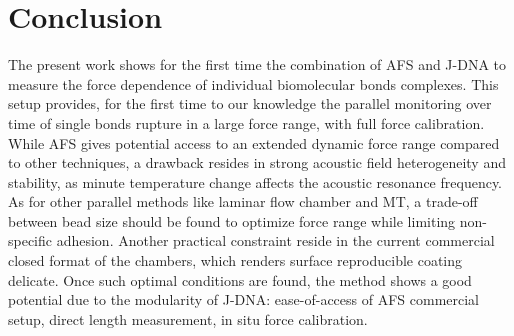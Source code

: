 \documentclass{biophys-new}
\begin{document}
%
%
%

\section*{Conclusion}

The present work shows for the first time the combination of AFS and J-DNA to measure the force dependence of individual biomolecular bonds complexes. This setup provides, for the first time to our knowledge the parallel monitoring over time of single bonds rupture in a large force range, with full force calibration. While AFS gives potential access to an extended dynamic force range compared to other techniques, a drawback resides in strong acoustic field heterogeneity and stability, as minute temperature change affects the acoustic resonance frequency. As for other parallel methods like laminar flow chamber and MT, a trade-off between bead size should be found to optimize force range while limiting non-specific adhesion. Another practical constraint reside in the current commercial closed format of the chambers, which renders surface reproducible coating delicate. Once such optimal conditions are found, the method shows a good potential due to the modularity of J-DNA: ease-of-access of AFS commercial setup, direct length measurement, in situ force calibration.
\end{document}
